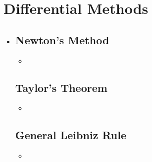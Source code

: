 \section{Differential Methods}
\begin{itemize}
  \item []
  
  \subsection{Newton's Method}
  \begin{itemize}
    \item 
  \end{itemize}

  \subsection{Taylor's Theorem}
  \begin{itemize}
    \item 
  \end{itemize}
  
  \subsection{General Leibniz Rule}
  \begin{itemize}
    \item 
  \end{itemize}
  
\end{itemize}